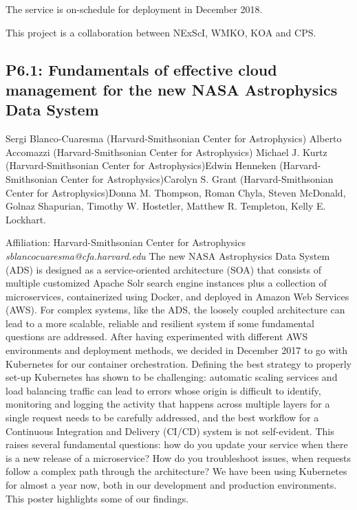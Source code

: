\documentclass{report}
\begin{document}
The service is on-schedule for deployment in December 2018.

This project is a collaboration between NExScI, WMKO, KOA and CPS.\newline
\newpage
\subsection*{P6.1: Fundamentals of effective cloud management for the new NASA Astrophysics Data System}
\bigskip
Sergi Blanco-Cuaresma (Harvard-Smithsonian Center for Astrophysics) \newline Alberto Accomazzi (Harvard-Smithsonian Center for Astrophysics) \newline  Michael J. Kurtz (Harvard-Smithsonian Center for Astrophysics)\newline  Edwin Henneken (Harvard-Smithsonian Center for Astrophysics)\newline Carolyn S. Grant (Harvard-Smithsonian Center for Astrophysics)\newline  Donna M. Thompson,
Roman Chyla,
Steven McDonald,
Golnaz Shapurian,
Timothy W. Hostetler,
Matthew R. Templeton,
Kelly E. Lockhart.

Affiliation: Harvard-Smithsonian Center for Astrophysics\newline\newline
{\it sblancocuaresma@cfa.harvard.edu}\newline
\newline\newline
The new NASA Astrophysics Data System (ADS) is designed as a service-oriented architecture (SOA) that consists of multiple customized Apache Solr search engine instances plus a collection of microservices, containerized using Docker, and deployed in Amazon Web Services (AWS). For complex systems, like the ADS, the loosely coupled architecture can lead to a more scalable, reliable and resilient system if some fundamental questions are addressed. After having experimented with different AWS environments and deployment methods, we decided in December 2017 to go with Kubernetes for our container orchestration. Defining the best strategy to properly set-up Kubernetes has shown to be challenging: automatic scaling services and load balancing traffic can lead to errors whose origin is difficult to identify, monitoring and logging the activity that happens across multiple layers for a single request needs to be carefully addressed, and the best workflow for a Continuous Integration and Delivery (CI/CD) system is not self-evident. This raises several fundamental questions: how do you update your service when there is a new release of a microservice? How do you troubleshoot issues, when requests follow a complex path through the architecture? We have been using Kubernetes for almost a year now, both in our development and production environments. This poster highlights some of our findings.\newline
\newpage
\end{document}
